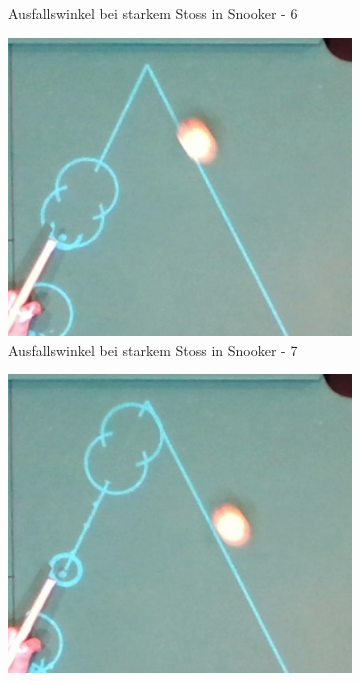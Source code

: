 \begin{figure}[h!]
\begin{subfigure}[t]{0.2\textwidth}
        \caption{Ausfallswinkel bei starkem Stoss in Snooker - 6}
        \label{fig:rebound_angle_fast_snooker_6}
    \end{subfigure}
    \hfill
    \begin{subfigure}[t]{0.2\textwidth}
        \centering
        \includegraphics[width=1.0\linewidth]{../common/04_results/resources/simulation/rebound_angle_fast_snooker/00_rail_rebound_angle_fast_snooker_07.png}
        \caption{Ausfallswinkel bei starkem Stoss in Snooker - 7}
        \label{fig:rebound_angle_fast_snooker_7}
    \end{subfigure}
    \hfill
    \begin{subfigure}[t]{0.2\textwidth}
        \centering
        \includegraphics[width=1.0\linewidth]{../common/04_results/resources/simulation/rebound_angle_fast_snooker/00_rail_rebound_angle_fast_snooker_08.png}

\end{subfigure}
\end{figure}
